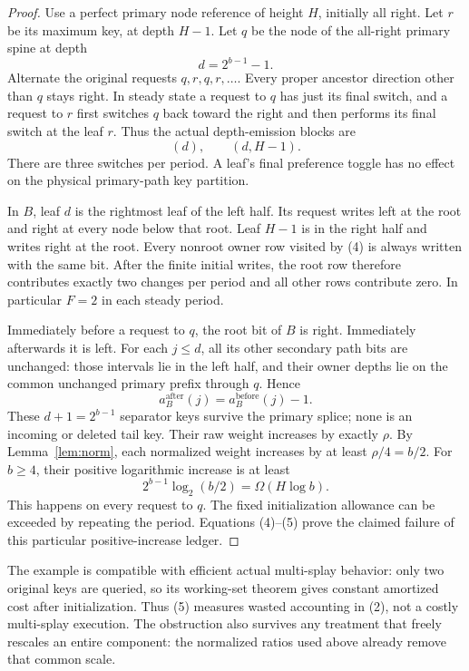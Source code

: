 \documentclass[11pt]{article}
\begin{document}
\begin{proof}
Use a perfect primary node reference of height $H$, initially all right.
Let $r$ be its maximum key, at depth $H-1$. Let $q$ be the node of
the all-right primary spine at depth
\[
 d=2^{b-1}-1.
\]
Alternate the original requests $q,r,q,r,\ldots$. Every proper
ancestor direction other than $q$ stays right. In steady state a
request to $q$ has just its final switch, and a request to $r$ first
switches $q$ back toward the right and then performs its final switch
at the leaf $r$. Thus the actual depth-emission blocks are
\[
 (d),\qquad(d,H-1).                            \tag{4}
\]
There are three switches per period. A leaf's final preference toggle
has no effect on the physical primary-path key partition.

In $B$, leaf $d$ is the rightmost leaf of the left half. Its request
writes left at the root and right at every node below that root.
Leaf $H-1$ is in the right half and writes right at the root. Every
nonroot owner row visited by (4) is always written with the same bit.
After the finite initial writes, the root row therefore contributes
exactly two changes per period and all other rows contribute zero.
In particular $F=2$ in each steady period.

Immediately before a request to $q$, the root bit of $B$ is right.
Immediately afterwards it is left. For each $j\le d$, all its other
secondary path bits are unchanged: those intervals lie in the left
half, and their owner depths lie on the common unchanged primary
prefix through $q$. Hence
\[
 a_B^{\mathrm{after}}(j)=a_B^{\mathrm{before}}(j)-1.
\]
These $d+1=2^{b-1}$ separator keys survive the primary splice; none is
an incoming or deleted tail key. Their raw weight increases by exactly
$\rho$. By Lemma~\ref{lem:norm}, each normalized weight increases by
at least $\rho/4=b/2$. For $b\ge4$, their positive logarithmic
increase is at least
\[
 2^{b-1}\log_2(b/2)=\Omega(H\log b).          \tag{5}
\]
This happens on every request to $q$. The fixed initialization allowance
can be exceeded by repeating the period. Equations (4)--(5) prove the
claimed failure of this particular positive-increase ledger.
\end{proof}

The example is compatible with efficient actual multi-splay behavior:
only two original keys are queried, so its working-set theorem gives
constant amortized cost after initialization. Thus (5) measures wasted
accounting in (2), not a costly multi-splay execution. The obstruction
also survives any treatment that freely rescales an entire component:
the normalized ratios used above already remove that common scale.
\end{document}
